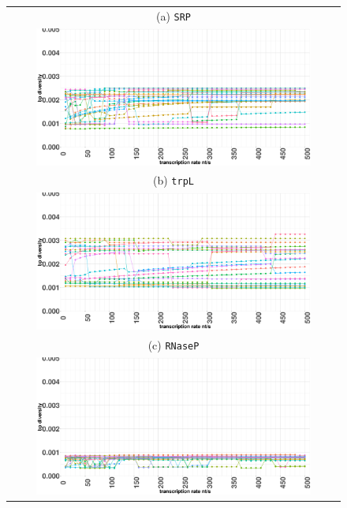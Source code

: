 \documentclass[ twoside,openright,titlepage,numbers=noenddot,headinclude,%
                footinclude=false, cleardoublepage=empty,abstractoff, %
                BCOR=5mm,paper=a4,fontsize=11pt,%
                ngerman,american,%
                ]{scrreprt}
\begin{document}
\begin{figure}[ht] 
\centering
\begin{tabular}{c}
(a) \texttt{SRP} \\
 \includegraphics[width=0.85\textwidth]{./pictures/basePairDiversity/TimeDepended/forAlignment/RF00169.pdf} \\
\hline
(b) \texttt{trpL} \\
 \includegraphics[width=0.85\textwidth]{./pictures/basePairDiversity/TimeDepended/forAlignment/RF00513.pdf} \\
\hline
(c) \texttt{RNaseP} \\
 \includegraphics[width=0.85\textwidth]{./pictures/basePairDiversity/TimeDepended/forAlignment/RF00010.pdf} \\
\end{tabular}				


\end{figure}
\end{document}

